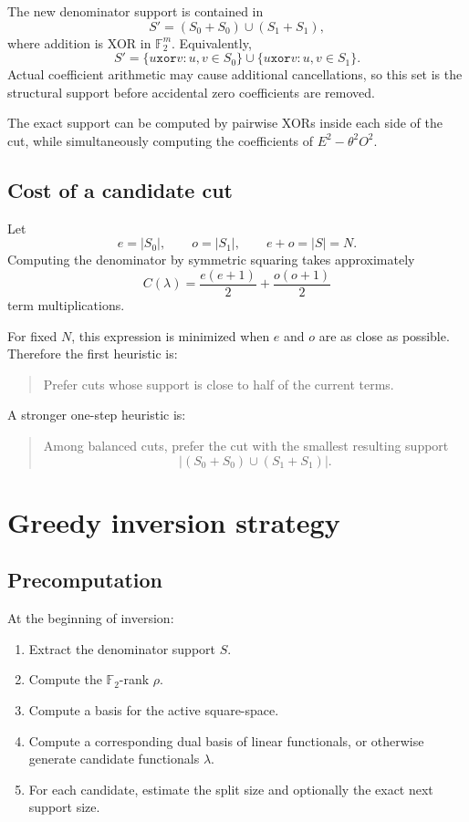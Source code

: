 \documentclass[11pt]{article}
\newcommand{\FF}{\mathbb{F}}
\newcommand{\xor}{\mathbin{\mathtt{xor}}}
\begin{document}
The new denominator support is contained in
\begin{equation}
  S' = (S_0+S_0)\cup(S_1+S_1),
\end{equation}
where addition is XOR in \(\FF_2^m\). Equivalently,
\begin{equation}
  S' = \{u\xor v:u,v\in S_0\}\cup\{u\xor v:u,v\in S_1\}.
\end{equation}
Actual coefficient arithmetic may cause additional cancellations, so this set is the structural support before accidental zero coefficients are removed.

The exact support can be computed by pairwise XORs inside each side of the cut, while simultaneously computing the coefficients of \(E^2-\theta^2O^2\).

\subsection{Cost of a candidate cut}

Let
\begin{equation}
  e=|S_0|,\qquad o=|S_1|,\qquad e+o=|S|=N.
\end{equation}
Computing the denominator by symmetric squaring takes approximately
\begin{equation}
  C(\lambda)=\frac{e(e+1)}{2}+\frac{o(o+1)}{2}
\end{equation}
term multiplications.

For fixed \(N\), this expression is minimized when \(e\) and \(o\) are as close as possible. Therefore the first heuristic is:
\begin{quote}
Prefer cuts whose support is close to half of the current terms.
\end{quote}

A stronger one-step heuristic is:
\begin{quote}
Among balanced cuts, prefer the cut with the smallest resulting support
\[
  |(S_0+S_0)\cup(S_1+S_1)|.
\]
\end{quote}

\section{Greedy inversion strategy}

\subsection{Precomputation}

At the beginning of inversion:
\begin{enumerate}[label=\arabic*.]
  \item Extract the denominator support \(S\).
  \item Compute the \(\FF_2\)-rank \(\rho\).
  \item Compute a basis for the active square-space.
  \item Compute a corresponding dual basis of linear functionals, or otherwise generate candidate functionals \(\lambda\).
  \item For each candidate, estimate the split size and optionally the exact next support size.
\end{enumerate}
\end{document}
